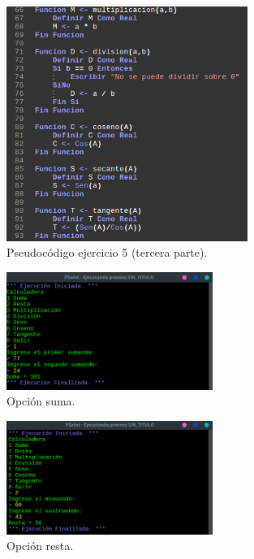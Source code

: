 \documentclass[11pt, a4paper]{report}
\begin{document}
\begin{figure}[!ht]
\begin{center}
  \includegraphics[width=0.7\textwidth]{ejercicio53.png}
  \caption{Pseudoc\'odigo ejercicio 5 (tercera parte).}
\end{center}
\end{figure}

\begin{figure}[!ht]
\begin{center}
  \includegraphics[width=0.6\textwidth]{respuesta14.png}
  \caption{Opci\'on suma.}
\end{center}
\end{figure}

\begin{figure}[!ht]
\begin{center}
  \includegraphics[width=0.6\textwidth]{respuesta15.png}
  \caption{Opci\'on resta.}
\end{center}
\end{figure}
\end{document}
